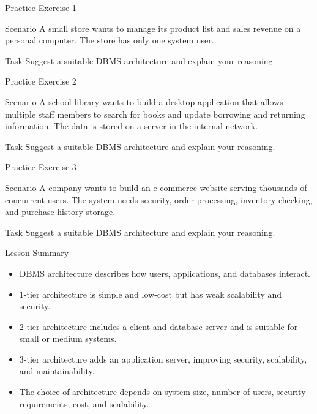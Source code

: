 \documentclass[aspectratio=169,11pt]{beamer}
\newcommand{\tightlist}{\setlength{\itemsep}{2pt}\setlength{\parskip}{0pt}}
\begin{document}
\begin{frame}{Practice Exercise 1}
\small
\begin{block}{Scenario}
A small store wants to manage its product list and sales revenue on a personal computer. The store has only one system user.
\end{block}

\begin{exampleblock}{Task}
Suggest a suitable DBMS architecture and explain your reasoning.
\end{exampleblock}
\end{frame}

\begin{frame}{Practice Exercise 2}
\small
\begin{block}{Scenario}
A school library wants to build a desktop application that allows multiple staff members to search for books and update borrowing and returning information. The data is stored on a server in the internal network.
\end{block}

\begin{exampleblock}{Task}
Suggest a suitable DBMS architecture and explain your reasoning.
\end{exampleblock}
\end{frame}

\begin{frame}{Practice Exercise 3}
\small
\begin{block}{Scenario}
A company wants to build an e-commerce website serving thousands of concurrent users. The system needs security, order processing, inventory checking, and purchase history storage.
\end{block}

\begin{exampleblock}{Task}
Suggest a suitable DBMS architecture and explain your reasoning.
\end{exampleblock}
\end{frame}

\begin{frame}{Lesson Summary}
\small
\begin{itemize}
\tightlist
  \item DBMS architecture describes how users, applications, and databases interact.
  \item 1-tier architecture is simple and low-cost but has weak scalability and security.
  \item 2-tier architecture includes a client and database server and is suitable for small or medium systems.
  \item 3-tier architecture adds an application server, improving security, scalability, and maintainability.
  \item The choice of architecture depends on system size, number of users, security requirements, cost, and scalability.
\end{itemize}
\end{frame}
\end{document}
